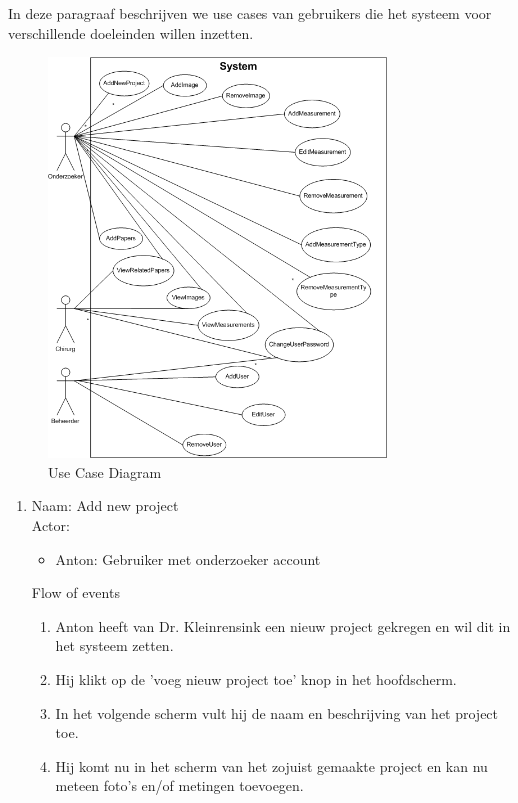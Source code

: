In deze paragraaf beschrijven we use cases van gebruikers die het systeem voor verschillende doeleinden willen inzetten.
\begin{figure}[htp]
\begin{center}
	\includegraphics[width=0.8\textwidth]{UseCaseDiagram}
\caption{Use Case Diagram}
\label{default}
\end{center}
\end{figure}


\begin{enumerate}

\item   Naam: Add new project  \\
	Actor:
	\begin{itemize}
		\item Anton: Gebruiker met onderzoeker account
	\end{itemize}
	Flow of events
	\begin{enumerate}
		\item Anton heeft van Dr. Kleinrensink een nieuw project gekregen en wil dit in het systeem zetten.
		\item Hij klikt op de 'voeg nieuw project toe' knop in het hoofdscherm.
		\item In het volgende scherm vult hij de naam en beschrijving van het project toe.
		\item Hij komt nu in het scherm van het zojuist gemaakte project en kan nu meteen foto's en/of metingen toevoegen.
	\end{enumerate}
\end{enumerate}

